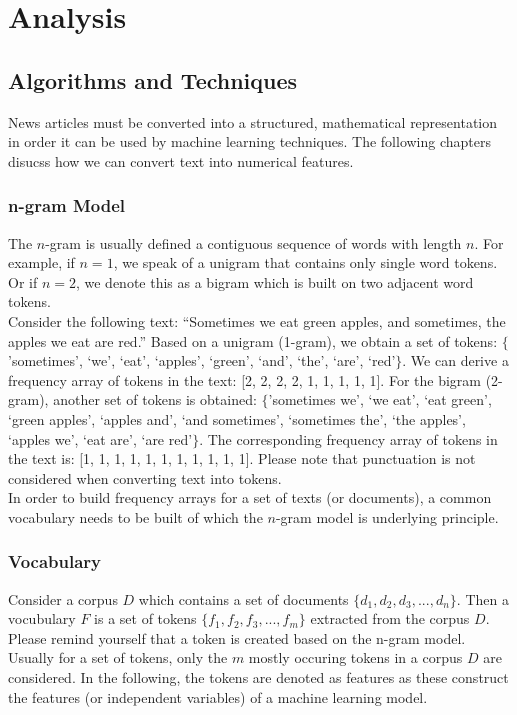 \documentclass[a4paper,12pt,nottoc]{article}
\begin{document}
\section{Analysis}

\subsection{Algorithms and Techniques}

News articles must be converted into a structured, mathematical representation in order it can be used by machine learning techniques. The following chapters disucss how we can convert text into numerical features.

\subsubsection{n-gram Model}

The $n$-gram is usually defined a contiguous sequence of words with length $n$. For example, if $n = 1$, we speak of a unigram that contains only single word tokens. Or if $n = 2$, we denote this as a bigram which is built on two adjacent word tokens.\\

\noindent Consider the following text: ``Sometimes we eat green apples, and sometimes, the apples we eat are red.'' Based on a unigram (1-gram), we obtain a set of tokens: $\{$'sometimes', `we', `eat', `apples', `green', `and', `the', `are', `red'$\}$. We can derive a frequency array of tokens in the text: [2, 2, 2, 2, 1, 1, 1, 1, 1]. For the bigram (2-gram), another set of tokens is obtained: $\{$'sometimes we', `we eat', `eat green', `green apples', `apples and', `and sometimes', `sometimes the', `the apples', `apples we', `eat are', `are red'$\}$. The corresponding frequency array of tokens in the text is: [1, 1, 1, 1, 1, 1, 1, 1, 1, 1, 1]. Please note that punctuation is not considered when converting text into tokens.\\

\noindent In order to build frequency arrays for a set of texts (or documents), a common vocabulary needs to be built of which the $n$-gram model is underlying principle.

\subsubsection{Vocabulary}

Consider a corpus $D$ which contains a set of documents $\{d_1, d_2, d_3, ..., d_n\}$. Then a vocubulary $F$ is a set of tokens $\{f_1, f_2, f_3, ..., f_m\}$ extracted from the corpus $D$. Please remind yourself that a token is created based on the n-gram model. Usually for a set of tokens, only the $m$ mostly occuring tokens in a corpus $D$ are considered. In the following, the tokens are denoted as features as these construct the features (or independent variables) of a machine learning model.\\
\end{document}
